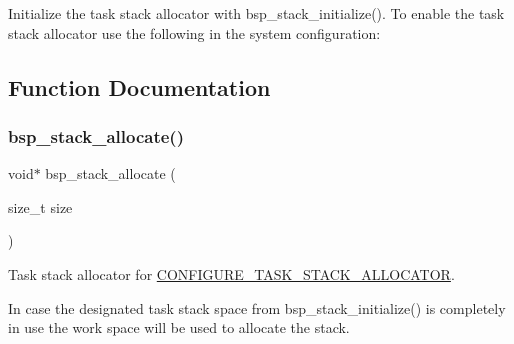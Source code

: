 Initialize the task stack allocator with bsp\+\_\+stack\+\_\+initialize(). To enable the task stack allocator use the following in the system configuration\+:


\begin{DoxyCode}{0}
\DoxyCodeLine{}
\DoxyCodeLine{\textcolor{preprocessor}{\#define CONFIGURE\_INIT}}
\DoxyCodeLine{}
\end{DoxyCode}
 

\subsection{Function Documentation}
\mbox{\label{group__bsp__stack_ga223d4cdc3855e573987ecc66ddb9dacd}} 
\subsubsection{\texorpdfstring{bsp\_stack\_allocate()}{bsp\_stack\_allocate()}}
{\footnotesize\ttfamily void$\ast$ bsp\+\_\+stack\+\_\+allocate (\begin{DoxyParamCaption}\item[{size\+\_\+t}]{size }\end{DoxyParamCaption})}



Task stack allocator for \mbox{\hyperlink{group__bsp__stack_ga78aadbd6dc37d63e9a973832e76ef07b}{C\+O\+N\+F\+I\+G\+U\+R\+E\+\_\+\+T\+A\+S\+K\+\_\+\+S\+T\+A\+C\+K\+\_\+\+A\+L\+L\+O\+C\+A\+T\+OR}}. 

In case the designated task stack space from bsp\+\_\+stack\+\_\+initialize() is completely in use the work space will be used to allocate the stack. 